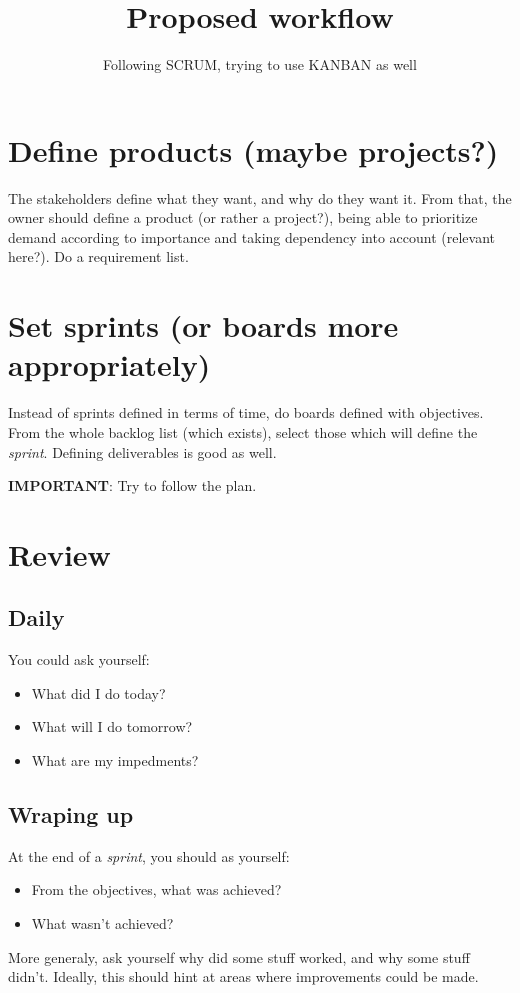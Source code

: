 \documentclass{article}
\title{Proposed workflow}
\author{Following SCRUM, trying to use KANBAN as well}
\date{}
\begin{document}
\maketitle

\section{Define products (maybe projects?)}
The stakeholders define what they want, and why do they want it.
From that, the owner should define a product (or rather a project?),
being able to prioritize demand according to importance and taking
dependency into account (relevant here?). Do a requirement list.

\section{Set sprints (or boards more appropriately)}
Instead of sprints defined in terms of time, do boards defined with
objectives. From the whole backlog list (which exists), select those
which will define the \textit{sprint}. Defining deliverables is
good as well.

\textbf{IMPORTANT}: Try to follow the plan.

\section{Review}

\subsection{Daily}
You could ask yourself:
\begin{itemize}
\item What did I do today?
\item What will I do tomorrow?
\item What are my impedments?
\end{itemize}

\subsection{Wraping up}
At the end of a \textit{sprint}, you should as yourself:
\begin{itemize}
\item From the objectives, what was achieved?
\item What wasn't achieved?
\end{itemize}
More generaly, ask yourself why did some stuff worked, and why
some stuff didn't. Ideally, this should hint at areas where improvements
could be made.
\end{document}
